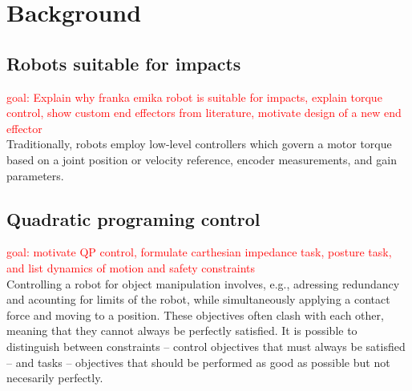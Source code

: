 \documentclass[a4paper, 10pt, conference]{ieeeconf}
\begin{document}
    \section{Background}
    \subsection{Robots suitable for impacts}
    \textcolor{red}{goal: Explain why franka emika robot is suitable for impacts, explain torque control, show custom end effectors from literature, motivate design of a new end effector}\\
    Traditionally, robots employ low-level controllers which govern a motor torque based on a joint position or velocity reference, encoder measurements, and gain parameters. 






    
    \subsection{Quadratic programing control} \label{sec:QP}
     \textcolor{red}{goal: motivate QP control, formulate carthesian impedance task, posture task, and list dynamics of motion and safety constraints }\\
     Controlling a robot for object manipulation involves, e.g., adressing redundancy and acounting for limits of the robot, while simultaneously applying a contact force and moving to a position. These objectives often clash with each other, meaning that they cannot always be perfectly satisfied. It is possible to distinguish between constraints -- control objectives that must always be satisfied -- and tasks -- objectives that should be performed as good as possible but not necesarily perfectly.
\end{document}
